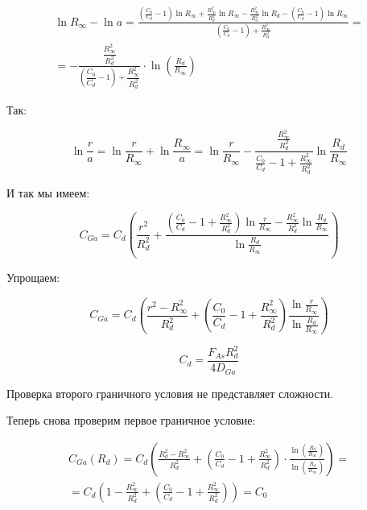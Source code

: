 \documentclass[14pt,oneside]{extarticle}
\begin{document}
\begin{multline*}
    \ln R_{\infty} - \ln a =
    \frac{
    \left( \frac{C_0}{C_d} - 1 \right) \ln R_{\infty}
    + \frac{R_{\infty}^2}{R_d^2} \ln R_{\infty}
    - \frac{R_{\infty}^2}{R_d^2} \ln R_d
    - \left( \frac{C_0}{C_d} - 1 \right) \ln R_{\infty}
    }{
    \left( \frac{C_0}{C_d} - 1 \right) + \frac{R_{\infty}^2}{R_d^2}
    } = \\
    = -\frac{ \dfrac{R_{\infty}^2}{R_d^2} }{ 
    \left( \dfrac{C_0}{C_d} - 1 \right) + \dfrac{R_{\infty}^2}{R_d^2} 
    }
    \cdot \ln \left( \frac{R_d}{R_{\infty}} \right)
\end{multline*}
    
   
Так:

\[
\ln\frac{r}{a}=\ln\frac{r}{R_{\infty}}+\ln\frac{R_{\infty}}{a}=\ln\frac{r}{R_{\infty}}-\frac{\frac{R_{\infty}^{2}}{R_{d}^{2}}}{\frac{C_{0}}{C_{d}}-1+\frac{R_{\infty}^{2}}{R_{d}^{2}}}\ln\frac{R_{d}}{R_{\infty}}
\]

И так мы имеем:

\[
C_{Ga}=C_{d}\left(\frac{r^{2}}{R_{d}^{2}}+\frac{\left(\frac{C_{0}}{C_{d}}-1+\frac{R_{\infty}^{2}}{R_{d}^{2}}\right)\ln\frac{r}{R_{\infty}}-\frac{R_{\infty}^{2}}{R_{d}^{2}}\ln\frac{R_{d}}{R_{\infty}}}{\ln\frac{R_{d}}{R_{\infty}}}\right)
\]

Упрощаем:

\begin{equation}
    C_{Ga}=C_{d}\left(\frac{r^{2}-R_{\infty}^{2}}{R_{d}^{2}}+\left(\frac{C_{0}}{C_{d}}-1+\frac{R_{\infty}^{2}}{R_{d}^{2}}\right)\frac{\ln\frac{r}{R_{\infty}}}{\ln\frac{R_{d}}{R_{\infty}}}\right)
\end{equation}

\[
C_{d}=\frac{F_{As}R_{d}^{2}}{4D_{Ga}}
\]

Проверка второго граничного условия не представляет сложности. 

Теперь снова проверим первое граничное условие:

\begin{multline*}
    C_{Ga}(R_d) = C_d \left(
    \frac{R_d^2 - R_{\infty}^2}{R_d^2}
    + \left(
    \frac{C_0}{C_d} - 1 + \frac{R_{\infty}^2}{R_d^2}
    \right)
    \cdot
    \frac{ \ln \left( \frac{R_d}{R_{\infty}} \right) }{ \ln \left( \frac{R_d}{R_{\infty}} \right) }
    \right) = \\
    = C_d \left(
    1 - \frac{R_{\infty}^2}{R_d^2}
    + \left( \frac{C_0}{C_d} - 1 + \frac{R_{\infty}^2}{R_d^2} \right)
    \right) = C_0
\end{multline*}
    
\end{document}
